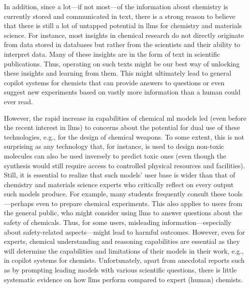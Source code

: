 \documentclass[11pt, oneside]{article}
\begin{document}
\begin{refsection}
In addition, since a lot---if not most---of the information about chemistry is currently stored and communicated in text, there is a strong reason to believe that there is still a lot of untapped potential in \glspl{llm} for chemistry and materials science.\autocite{miret2024llms}
For instance, most insights in chemical research do not directly originate from data stored in databases but rather from the scientists and their ability to interpret data. 
Many of these insights are in the form of text in scientific publications. 
Thus, operating on such texts might be our best way of unlocking these insights and learning from them.
This might ultimately lead to general copilot systems for chemists that can provide answers to questions or even suggest new experiments based on vastly more information than a human could ever read.

However, the rapid increase in capabilities of chemical \gls{ml} models led (even before the recent interest in \glspl{llm}) to concerns about the potential for dual use of these technologies, e.g., for the design of chemical weapons.\autocite{gopal2023releasing, ganguli2022red, Urbina_2022, campbell2023censoring, moulange2023towards, urbina2022teachable}
To some extent, this is not surprising as any technology that, for instance, is used to design non-toxic molecules can also be used inversely to predict toxic ones (even though the synthesis would still require access to controlled physical resources and facilities).
Still, it is essential to realize that such models' user base is wider than that of chemistry and materials science experts who critically reflect on every output such models produce. 
For example, many students frequently consult these tools---perhaps even to prepare chemical experiments.\autocite{Intelligent.com_2023}
This also applies to users from the general public, who might consider using \glspl{llm} to answer questions about the safety of chemicals.
Thus, for some users, misleading information---especially about safety-related aspects---might lead to harmful outcomes. 
However, even for experts, chemical understanding and reasoning capabilities are essential as they will determine the capabilities and limitations of their models in their work, e.g., in copilot systems for chemists.
Unfortunately, apart from anecdotal reports such as by prompting leading models with various scientific questions,\autocite{ai4science2023impact} there is little systematic evidence on how \glspl{llm} perform compared to expert (human) chemists.


\end{refsection}
\end{document}
